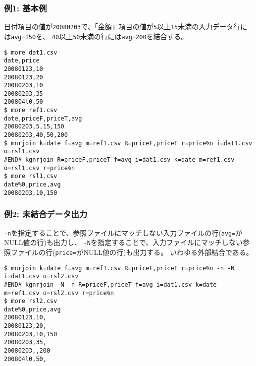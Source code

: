\subsubsection*{例1: 基本例}

日付項目の値が\verb|20080203|で、「金額」項目の値が\verb|5|以上\verb|15|未満の入力データ行には\verb|avg=150|を、
\verb|40|以上\verb|50|未満の行には\verb|avg=200|を結合する。


\begin{Verbatim}[baselinestretch=0.7,frame=single]
$ more dat1.csv
date,price
20080123,10
20080123,20
20080203,10
20080203,35
200804l0,50
$ more ref1.csv
date,priceF,priceT,avg
20080203,5,15,150
20080203,40,50,200
$ mnrjoin k=date f=avg m=ref1.csv R=priceF,priceT r=price%n i=dat1.csv o=rsl1.csv
#END# kgnrjoin R=priceF,priceT f=avg i=dat1.csv k=date m=ref1.csv o=rsl1.csv r=price%n
$ more rsl1.csv
date%0,price,avg
20080203,10,150
\end{Verbatim}
\subsubsection*{例2: 未結合データ出力}

\verb|-n|を指定することで、参照ファイルにマッチしない入力ファイルの行(\verb|avg=|がNULL値の行)も出力し、
\verb|-N|を指定することで、入力ファイルにマッチしない参照ファイルの行(\verb|price=|がNULL値の行)も出力する。
いわゆる外部結合である。


\begin{Verbatim}[baselinestretch=0.7,frame=single]
$ mnrjoin k=date f=avg m=ref1.csv R=priceF,priceT r=price%n -n -N i=dat1.csv o=rsl2.csv
#END# kgnrjoin -N -n R=priceF,priceT f=avg i=dat1.csv k=date m=ref1.csv o=rsl2.csv r=price%n
$ more rsl2.csv
date%0,price,avg
20080123,10,
20080123,20,
20080203,10,150
20080203,35,
20080203,,200
200804l0,50,
\end{Verbatim}

